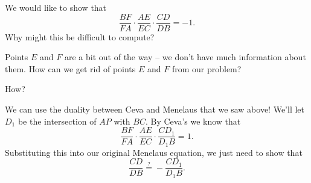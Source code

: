 


We would like to show that $$\frac{BF}{FA}\cdot\frac{AE}{EC}\cdot\frac{CD}{DB} = -1.$$ Why might this be difficult to compute?


Points $E$ and $F$ are a bit out of the way -- we don't have much information about them. How can we get rid of points $E$ and $F$ from our problem?




How?




We can use the duality between Ceva and Menelaus that we saw above! We'll let $D_1$ be the intersection of $AP$ with $BC$. By Ceva's we know that $$\frac{BF}{FA}\cdot\frac{AE}{EC}\cdot\frac{CD_1}{D_1B} = 1.$$ Substituting this into our original Menelaus equation, we just need to show that $$\frac{CD}{DB} \stackrel{?}{=} - \frac{CD_1}{D_1B}.$$




